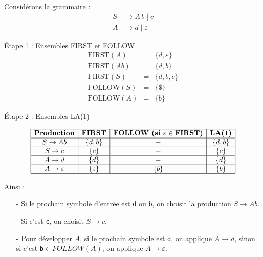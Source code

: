 \begin{example}
    Considérons la grammaire :
        \[
            \begin{aligned}
                S &\to A\,b \mid c \\
                A &\to d \mid \varepsilon
            \end{aligned}
        \]

    {Étape 1 : Ensembles FIRST et FOLLOW}
        \[
            \begin{array}{lcl}
                \text{FIRST}(A) &=& \{ d, \varepsilon \} \\[3pt]
                \text{FIRST}(A b) &=& \{ d, b \} \\[3pt]
                \text{FIRST}(S) &=& \{ d, b, c \} \\[6pt]
                \text{FOLLOW}(S) &=& \{ \$ \} \\[3pt]
                \text{FOLLOW}(A) &=& \{ b \}
            \end{array}
        \]

    {Étape 2 : Ensembles LA(1)}

        \[
            \begin{array}{|c|c|c|c|}
                \hline
                \textbf{Production} & \textbf{FIRST} & \textbf{FOLLOW (si $\varepsilon \in \text{FIRST}$)} & \textbf{LA(1)} \\
                \hline
                S \to A b & \{d, b\} & - & \{d, b\} \\
                \hline
                S \to c   & \{c\} & - & \{c\} \\
                \hline
                A \to d   & \{d\} & - & \{d\} \\
                \hline
                A \to \varepsilon & \{\varepsilon\} & \{b\} & \{b\} \\
                \hline
            \end{array}
        \]

    Ainsi :
    \begin{itemize}
        \item[-] Si le prochain symbole d'entrée est \texttt{d} ou \texttt{b}, on choisit la production $S \to A b$.
        \item[-] Si c'est \texttt{c}, on choisit $S \to c$.
        \item[-] Pour développer $A$, si le prochain symbole est \texttt{d}, on applique $A \to d$, sinon si c'est \texttt{b}$\in FOLLOW(A)$, on applique $A \to \varepsilon$.
    \end{itemize}
\end{example}

